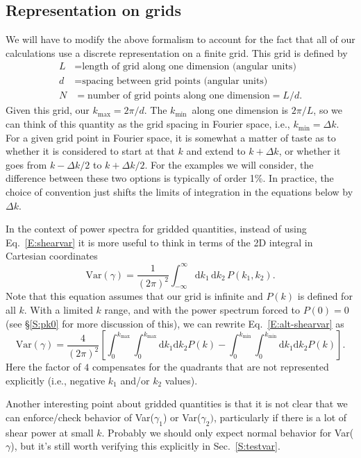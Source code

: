 \documentclass[preprint]{aastex}
\newcommand{\kmax}{\ensuremath{k_\mathrm{max}}}
\newcommand{\kmin}{\ensuremath{k_\mathrm{min}}}
\newcommand{\rmd}{\ensuremath{\mathrm{d}}}
\newcommand{\beq}{\begin{equation}}
\newcommand{\eeq}{\end{equation}}
\begin{document}
\subsection{Representation on grids}

We will have to modify the above formalism to account for the fact
that all of our calculations use a discrete representation on a finite
grid.  This 
grid is defined by
\begin{align}
L &= \mbox{length of grid along one dimension (angular units)}\\
d &= \mbox{spacing between grid points (angular units)}\\
N &= \mbox{number of grid points along one dimension} = L/d.
\end{align}
Given this grid, our $\kmax=2\pi/d$.  The \kmin\ along one dimension
is $2\pi/L$, so we can think of this quantity as the grid spacing in
Fourier space, i.e., $\kmin=\Delta k$.  For a given grid point in
Fourier space, it is
somewhat a matter of taste as to whether it is considered to start at
that $k$ and extend to $k+\Delta k$, or whether it goes from $k-\Delta
k/2$ to $k+\Delta k/2$.  For the examples we will consider, the
difference between these two options is typically of order 1\%.  In
practice, the choice of convention just shifts the limits of
integration in the equations below by $\Delta k$.

In the context 
of power spectra for gridded quantities, instead of using
Eq.~\ref{E:shearvar} it is more useful to think in
terms of the 2D integral in Cartesian coordinates
\beq\label{E:alt-shearvar}
\mathrm{Var}(\gamma) = \frac{1}{(2\pi)^2} \int_{-\infty}^{\infty} \rmd k_1 \,\rmd k_2 \,
P(k_1, k_2).
\eeq
Note that this equation assumes that our grid is infinite and $P(k)$
is defined for all $k$.  With a limited $k$
range, and with the power spectrum forced to $P(0)=0$ (see \S\ref{S:pk0}
for more discussion of this), we can rewrite Eq.~\ref{E:alt-shearvar} as
\beq\label{E:alt-shearvar-limit}
\mathrm{Var}(\gamma) = \frac{4}{(2\pi)^2} \left[\int_{0}^{\kmax}\int_{0}^{\kmax} \rmd
k_1 \rmd k_2 P(k) - \int_{0}^{\kmin}\int_{0}^{\kmin} \rmd k_1 \rmd k_2
P(k)\right].
\eeq
Here the factor of $4$ compensates for the 
quadrants that are not represented explicitly (i.e., negative $k_1$
and/or $k_2$ values).

Another interesting point about gridded quantities is that it is not
clear that we 
can enforce/check behavior of Var($\gamma_1$) or Var($\gamma_2)$,
particularly if 
there is a lot of shear power at small $k$.  Probably we should 
 only expect normal behavior for Var($\gamma$), but it's still worth
 verifying this explicitly in Sec.~\ref{S:testvar}.
\end{document}

